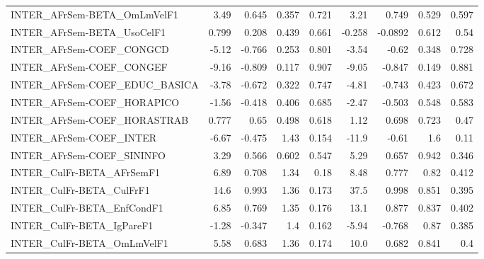 \begin{tabular}{lrrrrrrrr}
INTER\_AFrSem-BETA\_OmLmVelF1           &        3.49 &        0.645 &   0.357 &    0.721 &       3.21 &       0.749 &        0.529 &         0.597 \\
INTER\_AFrSem-BETA\_UsoCelF1            &       0.799 &        0.208 &   0.439 &    0.661 &     -0.258 &     -0.0892 &        0.612 &          0.54 \\
INTER\_AFrSem-COEF\_CONGCD              &       -5.12 &       -0.766 &   0.253 &    0.801 &      -3.54 &       -0.62 &        0.348 &         0.728 \\
INTER\_AFrSem-COEF\_CONGEF              &       -9.16 &       -0.809 &   0.117 &    0.907 &      -9.05 &      -0.847 &        0.149 &         0.881 \\
INTER\_AFrSem-COEF\_EDUC\_BASICA         &       -3.78 &       -0.672 &   0.322 &    0.747 &      -4.81 &      -0.743 &        0.423 &         0.672 \\
INTER\_AFrSem-COEF\_HORAPICO            &       -1.56 &       -0.418 &   0.406 &    0.685 &      -2.47 &      -0.503 &        0.548 &         0.583 \\
INTER\_AFrSem-COEF\_HORASTRAB           &       0.777 &         0.65 &   0.498 &    0.618 &       1.12 &       0.698 &        0.723 &          0.47 \\
INTER\_AFrSem-COEF\_INTER               &       -6.67 &       -0.475 &    1.43 &    0.154 &      -11.9 &       -0.61 &          1.6 &          0.11 \\
INTER\_AFrSem-COEF\_SININFO             &        3.29 &        0.566 &   0.602 &    0.547 &       5.29 &       0.657 &        0.942 &         0.346 \\
INTER\_CulFr-BETA\_AFrSemF1             &        6.89 &        0.708 &    1.34 &     0.18 &       8.48 &       0.777 &         0.82 &         0.412 \\
INTER\_CulFr-BETA\_CulFrF1              &        14.6 &        0.993 &    1.36 &    0.173 &       37.5 &       0.998 &        0.851 &         0.395 \\
INTER\_CulFr-BETA\_EnfCondF1            &        6.85 &        0.769 &    1.35 &    0.176 &       13.1 &       0.877 &        0.837 &         0.402 \\
INTER\_CulFr-BETA\_IgPareF1             &       -1.28 &       -0.347 &     1.4 &    0.162 &      -5.94 &      -0.768 &         0.87 &         0.385 \\
INTER\_CulFr-BETA\_OmLmVelF1            &        5.58 &        0.683 &    1.36 &    0.174 &       10.0 &       0.682 &        0.841 &           0.4 \\

\end{tabular}
